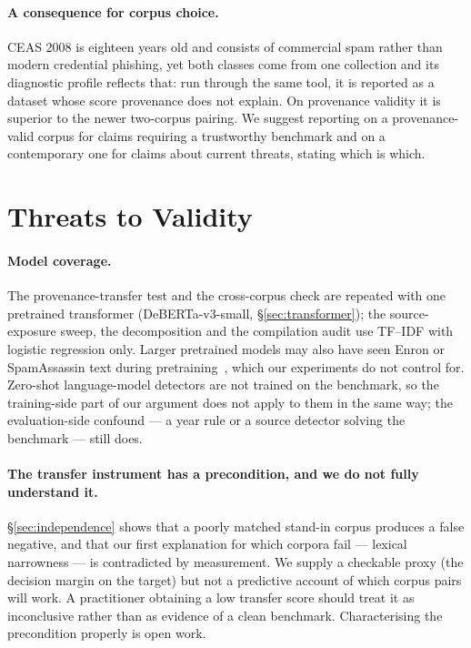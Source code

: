 \documentclass[twoside,11pt]{article}
\begin{document}
\paragraph{A consequence for corpus choice.}
CEAS 2008 is eighteen years old and consists of commercial spam rather than
modern credential phishing, yet both classes come from one collection and its
diagnostic profile reflects that: run through the same tool, it is reported
as a dataset whose score provenance does not explain. On provenance validity
it is superior to the newer two-corpus pairing. We suggest
reporting on a provenance-valid corpus for claims requiring a trustworthy
benchmark and on a contemporary one for claims about current threats, stating
which is which.

\section{Threats to Validity}
\label{sec:threats}

\paragraph{Model coverage.} The provenance-transfer test and the
cross-corpus check are repeated with one pretrained transformer
(DeBERTa-v3-small, \S\ref{sec:transformer}); the source-exposure sweep, the
decomposition and the compilation audit use TF--IDF with logistic regression
only. Larger pretrained models may also have seen Enron or SpamAssassin text
during pretraining~\citep{sainz2023nlp}, which our experiments do not control
for. Zero-shot language-model detectors are not trained on the benchmark, so
the training-side part of our argument does not apply to them in the same
way; the evaluation-side confound --- a year rule or a source detector solving
the benchmark --- still does.

\paragraph{The transfer instrument has a precondition, and we do not fully
understand it.} \S\ref{sec:independence} shows that a poorly matched stand-in
corpus produces a false negative, and that our first explanation for which
corpora fail --- lexical narrowness --- is contradicted by measurement. We
supply a checkable proxy (the decision margin on the target) but not a
predictive account of which corpus pairs will work. A practitioner obtaining a
low transfer score should treat it as inconclusive rather than as evidence of
a clean benchmark. Characterising the precondition properly is open work.
\end{document}
